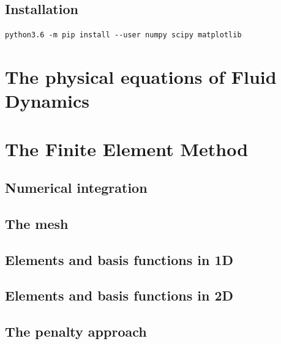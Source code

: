 \documentclass[a4paper]{article}
\begin{document}
\subsection{Installation}

\begin{verbatim}
python3.6 -m pip install --user numpy scipy matplotlib
\end{verbatim}

\newpage
\section{The physical equations of Fluid Dynamics}


\newpage
\section{The Finite Element Method}

\subsection{Numerical integration}


\subsection{The mesh}

\subsection{Elements and basis functions in 1D}

\subsection{Elements and basis functions in 2D}



\subsection{The penalty approach}




\end{document}
